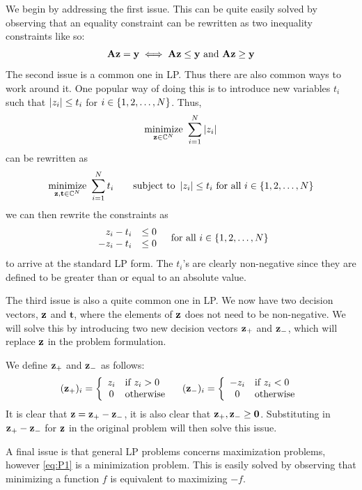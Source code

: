 We begin by addressing the first issue. This can be quite easily solved by observing that an equality constraint can be rewritten as two inequality constraints like so:
\[
	\mathbf{A}\mathbf{z} = \mathbf{y} \iff \mathbf{A}\mathbf{z} \leq \mathbf{y} \text{ and } \mathbf{A}\mathbf{z} \geq \mathbf{y}
\]
The second issue is a common one in LP. Thus there are also common ways to work around it. One popular way of doing this is to introduce new variables $ t_{i} $  such that $ \left|z_{i}\right| \leq t_{i} $ for $ i \in \{1, 2, \ldots, N\} $. Thus, 
\[ 
	\underset{\mathbf{z}\in\mathbb{C}^{N}}{\text{minimize}}~ \sum_{i=1}^{N} \left|z_{i}\right|
\]
can be rewritten as
\[ 
	\underset{\mathbf{z},\mathbf{t} \in \mathbb{C}^{N}}{\text{minimize}}~ \sum_{i=1}^{N}t_{i} \quad \quad\text{subject to}~ \left|z_{i}\right| \leq t_{i} \text{ for all } i \in \{1, 2, \ldots, N\}
\]
we can then rewrite the constraints as
\[
	\begin{array}{r l}
		z_{i} - t_{i} & \leq 0\\
		- z_{i} - t_{i} & \leq 0
	\end{array}
	\quad\text{for all } i \in \{1, 2, \ldots, N\}
\]
to arrive at the standard LP form. The $ t_{i} $'s are clearly non-negative since they are defined to be greater than or equal to an absolute value. 

The third issue is also a quite common one in LP. We now have two decision vectors, $ \mathbf{z}  $ and $ \mathbf{t} $, where the elements of $ \mathbf{z} $ does not need to be non-negative. We will solve this by introducing two new decision vectors $ \mathbf{z}_{+} $ and $ \mathbf{z}_{-} $, which will replace $ \mathbf{z} $ in the problem formulation. 

We define $ \mathbf{z}_{+} $ and $ \mathbf{z}_{-} $ as follows:
\[ 
	(\mathbf{z}_{+})_{i} = \left\{ \begin{array}{cl} z_{i} & \text{if } z_{i} > 0 \\ 0 & \text{otherwise} \end{array} \right.
	\quad
	(\mathbf{z}_{-})_{i} = \left\{ \begin{array}{cl} -z_{i} & \text{if } z_{i} < 0 \\ 0 & \text{otherwise} \end{array} \right.
\]
It is clear that $ \mathbf{z} = \mathbf{z}_{+} - \mathbf{z}_{-} $, it is also clear that $ \mathbf{z}_{+}, \mathbf{z}_{-} \geq \mathbf{0} $. Substituting in $ \mathbf{z}_{+} - \mathbf{z}_{-} $ for $ \mathbf{z} $ in the original problem will then solve this issue. 

A final issue is that general LP problems concerns maximization problems, however \eqref{eq:P1} is a minimization problem. This is easily solved by observing that minimizing a function $ f $ is equivalent to maximizing $ -f $.

